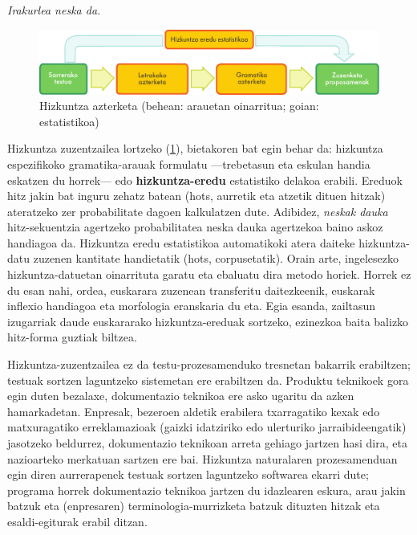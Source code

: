 \begin{multicols}{2}
\hspace{10pt}\textit{Irakurlea neska da.} 
 \begin{figure}[htb]
  \vspace{-9mm}
  \center
  \includegraphics[width=\textwidth]{../_media/basque/language_checking}
  \caption{Hizkuntza azterketa (behean: arauetan oinarritua; goian: estatistikoa)}
  \label{fig:langcheckingaarch_eu}
\end{figure}

Hizkuntza zuzentzailea lortzeko (\ref{fig:langcheckingaarch_eu}), bietakoren bat egin behar da: hizkuntza espezifikoko gramatika-arauak formulatu —trebetasun eta eskulan handia eskatzen du horrek— edo \textbf{hizkuntza-eredu} estatistiko delakoa erabili. Ereduok hitz jakin bat inguru zehatz batean (hots, aurretik eta atzetik dituen hitzak) ateratzeko zer probabilitate dagoen kalkulatzen dute. Adibidez, \textit{neskak dauka} hitz-sekuentzia agertzeko probabilitatea neska dauka agertzekoa baino askoz handiagoa da. Hizkuntza eredu estatistikoa automatikoki atera daiteke hizkuntza-datu zuzenen kantitate handietatik (hots, corpusetatik). Orain arte, ingelesezko hizkuntza-datuetan oinarrituta garatu eta ebaluatu dira metodo horiek. Horrek ez du esan nahi, ordea, euskarara zuzenean transferitu daitezkeenik, euskarak inflexio handiagoa eta morfologia eranskaria du eta. Egia esanda, zailtasun izugarriak daude euskararako hizkuntza-ereduak sortzeko, ezinezkoa baita balizko hitz-forma guztiak biltzea. 

Hizkuntza-zuzentzailea ez da testu-prozesamenduko tresnetan bakarrik erabiltzen; testuak sortzen laguntzeko sistemetan ere erabiltzen da. Produktu teknikoek gora egin duten bezalaxe, dokumentazio teknikoa ere asko ugaritu da azken hamarkadetan. Enpresak, bezeroen aldetik erabilera txarragatiko kexak edo matxuragatiko erreklamazioak (gaizki idatziriko edo ulerturiko jarraibideengatik) jasotzeko beldurrez, dokumentazio teknikoan arreta gehiago jartzen hasi dira, eta nazioarteko merkatuan sartzen ere bai. Hizkuntza naturalaren prozesamenduan egin diren aurrerapenek testuak sortzen laguntzeko softwarea ekarri dute; programa horrek dokumentazio teknikoa jartzen du idazlearen eskura, arau jakin batzuk eta (enpresaren) terminologia-murrizketa batzuk dituzten hitzak eta esaldi-egiturak erabil ditzan. 


\end{multicols}
